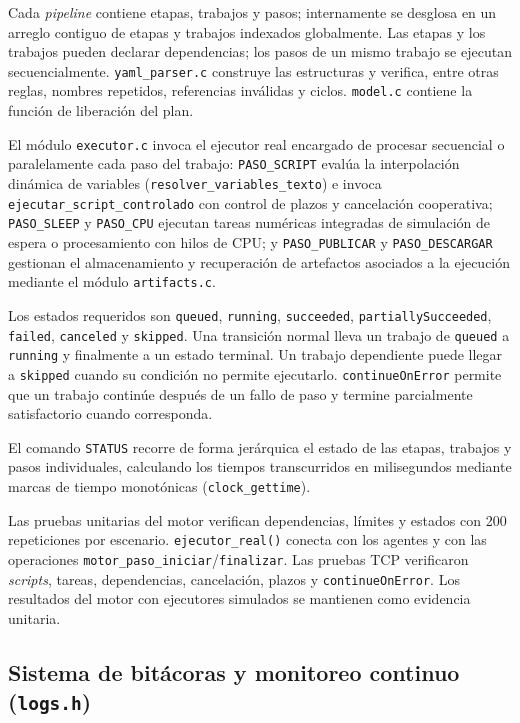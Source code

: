 \documentclass[12pt,a4paper]{article}
\newcommand{\code}[1]{\texttt{#1}}
\begin{document}
Cada \textit{pipeline} contiene etapas, trabajos y pasos; internamente se desglosa en un arreglo contiguo de etapas y trabajos indexados globalmente. Las etapas y los trabajos pueden declarar dependencias; los pasos de un mismo trabajo se ejecutan secuencialmente. \code{yaml\_parser.c} construye las estructuras y verifica, entre otras reglas, nombres repetidos, referencias inválidas y ciclos. \code{model.c} contiene la función de liberación del plan.

El módulo \code{executor.c} invoca el ejecutor real encargado de procesar secuencial o paralelamente cada paso del trabajo: \code{PASO\_SCRIPT} evalúa la interpolación dinámica de variables (\code{resolver\_variables\_texto}) e invoca \code{ejecutar\_script\_controlado} con control de plazos y cancelación cooperativa; \code{PASO\_SLEEP} y \code{PASO\_CPU} ejecutan tareas numéricas integradas de simulación de espera o procesamiento con hilos de CPU; y \code{PASO\_PUBLICAR} y \code{PASO\_DESCARGAR} gestionan el almacenamiento y recuperación de artefactos asociados a la ejecución mediante el módulo \code{artifacts.c}.

Los estados requeridos son \code{queued}, \code{running}, \code{succeeded}, \code{partiallySucceeded}, \code{failed}, \code{canceled} y \code{skipped}. Una transición normal lleva un trabajo de \code{queued} a \code{running} y finalmente a un estado terminal. Un trabajo dependiente puede llegar a \code{skipped} cuando su condición no permite ejecutarlo. \code{continueOnError} permite que un trabajo continúe después de un fallo de paso y termine parcialmente satisfactorio cuando corresponda.

El comando \code{STATUS} recorre de forma jerárquica el estado de las etapas, trabajos y pasos individuales, calculando los tiempos transcurridos en milisegundos mediante marcas de tiempo monotónicas (\code{clock\_gettime}).

Las pruebas unitarias del motor verifican dependencias, límites y estados con 200 repeticiones por escenario. \code{ejecutor\_real()} conecta con los agentes y con las operaciones \code{motor\_paso\_iniciar}/\code{finalizar}. Las pruebas TCP verificaron \textit{scripts}, tareas, dependencias, cancelación, plazos y \code{continueOnError}. Los resultados del motor con ejecutores simulados se mantienen como evidencia unitaria.

\subsection{Sistema de bitácoras y monitoreo continuo (\code{logs.h})}
\end{document}
